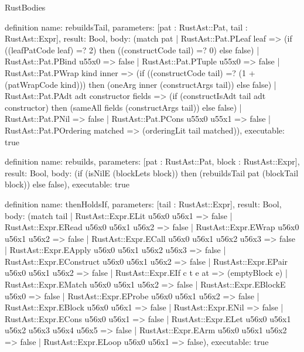 \begin{lexlean}{RustBodies}
\begin{semanticmodule}
definition{
  name: rebuildsTail,
  parameters: [pat : RustAst::Pat, tail : RustAst::Expr],
  result: Bool,
  body: (match pat
    | RustAst::Pat.PLeaf leaf => (if ((leafPatCode leaf) =? 2) then ((constructCode tail) =? 0) else false)
    | RustAst::Pat.PBind u55x0 => false
    | RustAst::Pat.PTuple u55x0 => false
    | RustAst::Pat.PWrap kind inner => (if ((constructCode tail) =? (1 + (patWrapCode kind))) then (oneArg inner (constructArgs tail)) else false)
    | RustAst::Pat.PAdt adt constructor fields => (if (constructIsAdt tail adt constructor) then (sameAll fields (constructArgs tail)) else false)
    | RustAst::Pat.PNil => false
    | RustAst::Pat.PCons u55x0 u55x1 => false
    | RustAst::Pat.POrdering matched => (orderingLit tail matched)),
  executable: true
}

definition{
  name: rebuilds,
  parameters: [pat : RustAst::Pat, block : RustAst::Expr],
  result: Bool,
  body: (if (isNilE (blockLets block)) then (rebuildsTail pat (blockTail block)) else false),
  executable: true
}

definition{
  name: thenHoldsIf,
  parameters: [tail : RustAst::Expr],
  result: Bool,
  body: (match tail
    | RustAst::Expr.ELit u56x0 u56x1 => false
    | RustAst::Expr.ERead u56x0 u56x1 u56x2 => false
    | RustAst::Expr.EWrap u56x0 u56x1 u56x2 => false
    | RustAst::Expr.ECall u56x0 u56x1 u56x2 u56x3 => false
    | RustAst::Expr.EApply u56x0 u56x1 u56x2 u56x3 => false
    | RustAst::Expr.EConstruct u56x0 u56x1 u56x2 => false
    | RustAst::Expr.EPair u56x0 u56x1 u56x2 => false
    | RustAst::Expr.EIf c t e at => (emptyBlock e)
    | RustAst::Expr.EMatch u56x0 u56x1 u56x2 => false
    | RustAst::Expr.EBlockE u56x0 => false
    | RustAst::Expr.EProbe u56x0 u56x1 u56x2 => false
    | RustAst::Expr.EBlock u56x0 u56x1 => false
    | RustAst::Expr.ENil => false
    | RustAst::Expr.ECons u56x0 u56x1 => false
    | RustAst::Expr.ELet u56x0 u56x1 u56x2 u56x3 u56x4 u56x5 => false
    | RustAst::Expr.EArm u56x0 u56x1 u56x2 => false
    | RustAst::Expr.ELoop u56x0 u56x1 => false),
  executable: true
}


\end{semanticmodule}
\end{lexlean}
